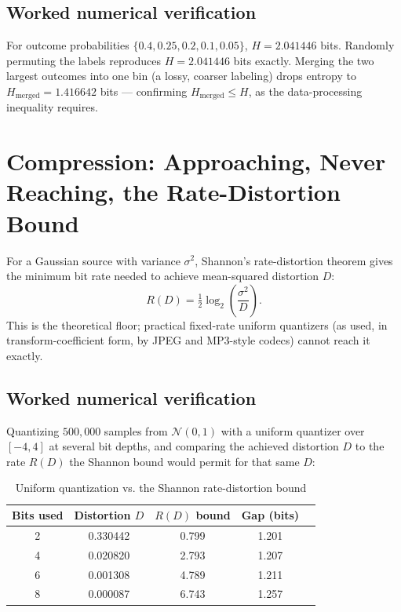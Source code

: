 \documentclass[10pt,journal,compsoc]{IEEEtran}
\begin{document}
\subsection{Worked numerical verification}
For outcome probabilities $\{0.4,0.25,0.2,0.1,0.05\}$, $H=2.041446$ bits. Randomly permuting the labels reproduces $H=2.041446$ bits exactly. Merging the two largest outcomes into one bin (a lossy, coarser labeling) drops entropy to $H_{\text{merged}}=1.416642$ bits — confirming $H_{\text{merged}} \le H$, as the data-processing inequality requires.

\section{Compression: Approaching, Never Reaching, the Rate-Distortion Bound}
For a Gaussian source with variance $\sigma^2$, Shannon's rate-distortion theorem gives the minimum bit rate needed to achieve mean-squared distortion $D$:
\begin{equation}
    R(D) = \tfrac12\log_2\!\left(\frac{\sigma^2}{D}\right).
\end{equation}
This is the theoretical floor; practical fixed-rate uniform quantizers (as used, in transform-coefficient form, by JPEG and MP3-style codecs) cannot reach it exactly.

\subsection{Worked numerical verification}
Quantizing $500{,}000$ samples from $\mathcal N(0,1)$ with a uniform quantizer over $[-4,4]$ at several bit depths, and comparing the achieved distortion $D$ to the rate $R(D)$ the Shannon bound would permit for that same $D$:

\begin{table}[h]
\centering
\caption{Uniform quantization vs. the Shannon rate-distortion bound}
\begin{tabular}{ccccc}
\toprule
\textbf{Bits used} & \textbf{Distortion $D$} & \textbf{$R(D)$ bound} & \textbf{Gap (bits)} \\
\midrule
2 & 0.330442 & 0.799 & 1.201 \\
4 & 0.020820 & 2.793 & 1.207 \\
6 & 0.001308 & 4.789 & 1.211 \\
8 & 0.000087 & 6.743 & 1.257 \\
\bottomrule
\end{tabular}
\end{table}
\end{document}
